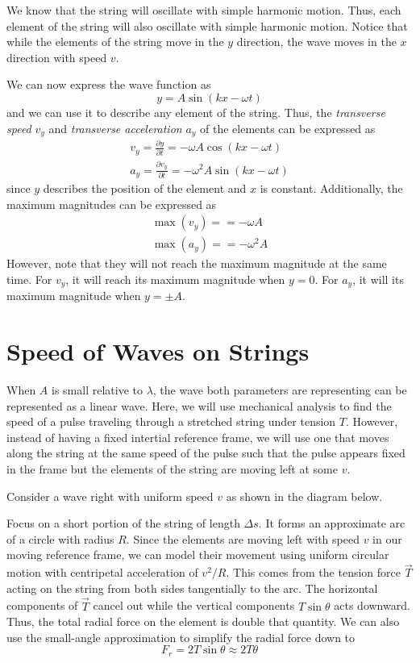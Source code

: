 We know that the string will oscillate with simple harmonic motion. Thus, each element of the string
will also oscillate with simple harmonic motion. Notice that while the elements of the string move 
in the $y$ direction, the wave moves in the $x$ direction with speed $v$.

We can now express the wave function as 
\[ y = A\sin(kx - \omega t) \]
and we can use it to describe any element of the string. Thus, the \textit{transverse speed} $v_y$
and \textit{transverse acceleration} $a_y$ of the elements can be expressed as 
\begin{eqnarray}
    v_y = \frac{\partial y}{\partial t} = -\omega A\cos(kx - \omega t)\label{16.14}\\
    a_y = \frac{\partial v_y}{\partial t} = -\omega^2 A\sin(kx - \omega t)\label{16.15}
\end{eqnarray}
since $y$ describes the position of the element and $x$ is constant. Additionally, the maximum 
magnitudes can be expressed as 
\begin{eqnarray}
    \max(v_y) = = -\omega A\label{16.16}\\
    \max(a_y) = = -\omega^2 A\label{16.17}
\end{eqnarray}
However, note that they will not reach the maximum magnitude at the same time. For $v_y$, it will 
reach its maximum magnitude when $y=0$. For $a_y$, it will its maximum magnitude when $y=\pm A$.

\section{Speed of Waves on Strings}

When $A$ is small relative to $\lambda$, the wave both parameters are representing can be represented
as a linear wave.
Here, we will use mechanical analysis to find the speed of a pulse traveling through a stretched 
string under tension $T$. However, instead of having a fixed intertial reference frame, we will 
use one that moves along the string at the same speed of the pulse such that the pulse appears
fixed in the frame but the elements of the string are moving left at some $v$.

Consider a wave right with uniform speed $v$ as shown in the diagram below. 


Focus on a short portion of the string of length $\Delta s$. It forms an approximate arc of a
circle with radius $R$.
Since the elements are moving left with speed $v$ in our moving reference frame, we can model 
their movement using uniform circular motion with centripetal acceleration of $v^2/R$. This comes 
from the tension force $\vec{T}$ acting on the string from both sides tangentially to the arc.
The horizontal components of $\vec{T}$ cancel out while the vertical components $T\sin\theta$
acts downward. Thus, the total radial force on the element is double that quantity. We can also use
the small-angle approximation to simplify the radial force down to
\[ F_r = 2T\sin\theta \approx 2T\theta \]

